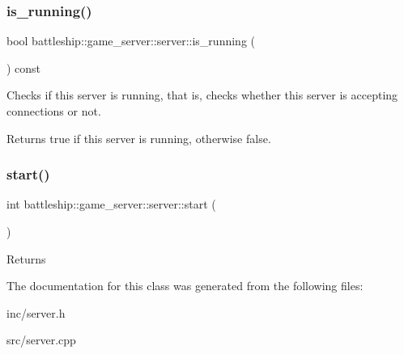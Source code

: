 \subsubsection{\texorpdfstring{is\+\_\+running()}{is\_running()}}
{\footnotesize\ttfamily bool battleship\+::game\+\_\+server\+::server\+::is\+\_\+running (\begin{DoxyParamCaption}{ }\end{DoxyParamCaption}) const\hspace{0.3cm}{\ttfamily [inline]}}

Checks if this server is running, that is, checks whether this server is accepting connections or not. \begin{DoxyReturn}{Returns}
true if this server is running, otherwise false. 
\end{DoxyReturn}
\mbox{\label{classbattleship_1_1game__server_1_1server_a07a7f97a9b7a5c1bcb0a4730a5e92745}} 
\subsubsection{\texorpdfstring{start()}{start()}}
{\footnotesize\ttfamily int battleship\+::game\+\_\+server\+::server\+::start (\begin{DoxyParamCaption}{ }\end{DoxyParamCaption})}

\begin{DoxyReturn}{Returns}

\end{DoxyReturn}


The documentation for this class was generated from the following files\+:\begin{DoxyCompactItemize}
\item 
inc/server.\+h\item 
src/server.\+cpp\end{DoxyCompactItemize}
